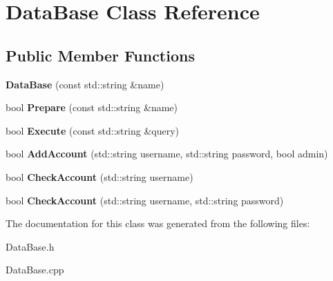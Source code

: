 \hypertarget{classDataBase}{\section{Data\-Base Class Reference}
\label{classDataBase}
}
\subsection*{Public Member Functions}
\begin{DoxyCompactItemize}
\item 
\hypertarget{classDataBase_a131e945676ae209fad9dcca64c2fcdef}{{\bfseries Data\-Base} (const std\-::string \&name)}\label{classDataBase_a131e945676ae209fad9dcca64c2fcdef}

\item 
\hypertarget{classDataBase_a6b53d823fd87e87c969e4cc1cb56eab9}{bool {\bfseries Prepare} (const std\-::string \&name)}\label{classDataBase_a6b53d823fd87e87c969e4cc1cb56eab9}

\item 
\hypertarget{classDataBase_ab2f507e2443638ca49a4c65612cf61bc}{bool {\bfseries Execute} (const std\-::string \&query)}\label{classDataBase_ab2f507e2443638ca49a4c65612cf61bc}

\item 
\hypertarget{classDataBase_a9d8dd3558ebe6723b0d6923f89949428}{bool {\bfseries Add\-Account} (std\-::string username, std\-::string password, bool admin)}\label{classDataBase_a9d8dd3558ebe6723b0d6923f89949428}

\item 
\hypertarget{classDataBase_a15cb9fb7099c197f25632681b49a094c}{bool {\bfseries Check\-Account} (std\-::string username)}\label{classDataBase_a15cb9fb7099c197f25632681b49a094c}

\item 
\hypertarget{classDataBase_abbffc7ed377bc7ade41ed7230e002eb9}{bool {\bfseries Check\-Account} (std\-::string username, std\-::string password)}\label{classDataBase_abbffc7ed377bc7ade41ed7230e002eb9}

\end{DoxyCompactItemize}


The documentation for this class was generated from the following files\-:\begin{DoxyCompactItemize}
\item 
Data\-Base.\-h\item 
Data\-Base.\-cpp\end{DoxyCompactItemize}
